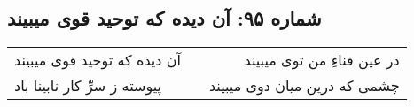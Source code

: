 \begin{center}
\section*{شماره ۹۵: آن دیده که توحید قوی میبیند}
\label{sec:095}
\begin{longtable}{l p{0.5cm} r}
آن دیده که توحید قوی میبیند
&&
در عین فناءِ من توی میبیند
\\
پیوسته ز سرِّ کار نابینا باد
&&
چشمی که درین میان دوی میبیند
\\
\end{longtable}
\end{center}
